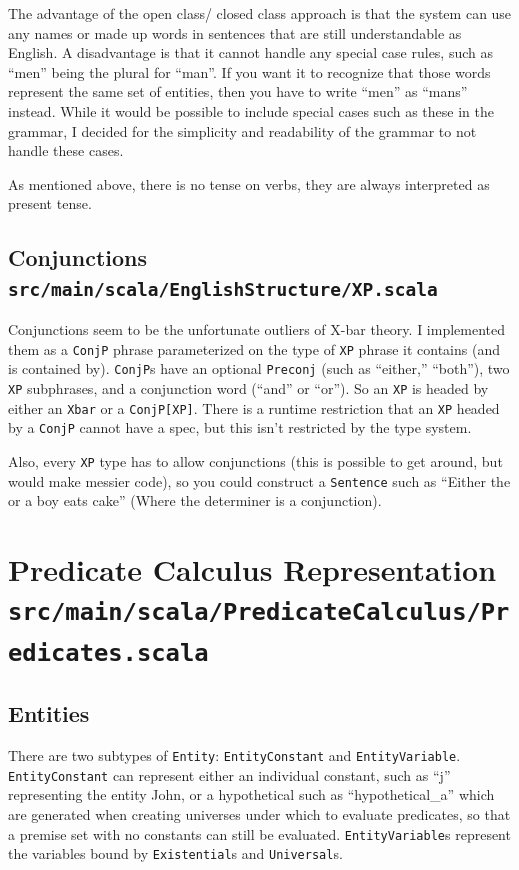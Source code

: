\documentclass[a4paper, 11pt]{article}
\begin{document}
The advantage of the open class/ closed class approach is that the system can use any names or made up words in sentences that are still understandable as English. A disadvantage is that it cannot handle any special case rules, such as ``men'' being the plural for ``man''. If you want it to recognize that those words represent the same set of entities, then you have to write ``men'' as ``mans'' instead. While it would be possible to include special cases such as these in the grammar, I decided for the simplicity and readability of the grammar to not handle these cases. 

As mentioned above, there is no tense on verbs, they are always interpreted as present tense.

\subsection[Conjunctions]{Conjunctions\\
	\normalsize \texttt{src/main/scala/EnglishStructure/XP.scala}}
Conjunctions seem to be the unfortunate outliers of X-bar theory. I implemented them as a \texttt{ConjP} phrase parameterized on the type of \texttt{XP} phrase it contains (and is contained by). \texttt{ConjP}s have an optional \texttt{Preconj} (such as ``either,'' ``both''), two \texttt{XP} subphrases, and a conjunction word (``and'' or ``or''). So an \texttt{XP} is headed by either an \texttt{Xbar} or a \texttt{ConjP[XP]}. There is a runtime restriction that an \texttt{XP} headed by a \texttt{ConjP} cannot have a spec, but this isn't restricted by the type system.

Also, every \texttt{XP} type has to allow conjunctions (this is possible to get around, but would make messier code), so you could construct a \texttt{Sentence} such as ``Either the or a boy eats cake'' (Where the determiner is a conjunction).


\section[Predicate Calculus Representation]{Predicate Calculus Representation\\
	\normalsize \texttt{src/main/scala/PredicateCalculus/Predicates.scala}}

\subsection{Entities}
There are two subtypes of \texttt{Entity}: \texttt{EntityConstant} and \texttt{EntityVariable}. \texttt{EntityConstant} can represent either an individual constant, such as ``j'' representing the entity John, or a hypothetical such as ``hypothetical\_a'' which are generated when creating universes under which to evaluate predicates, so that a premise set with no constants can still be evaluated. \texttt{EntityVariable}s represent the variables bound by \texttt{Existential}s and \texttt{Universal}s.
\end{document}

